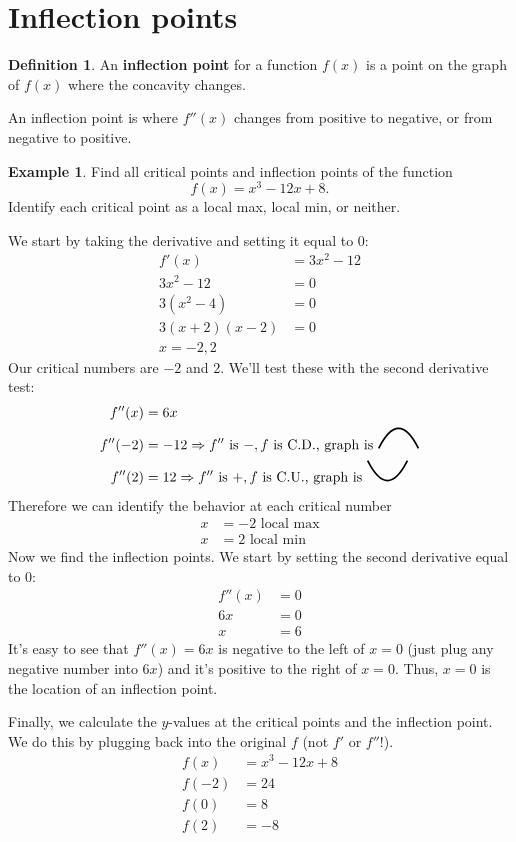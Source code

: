 \documentclass[oneside]{book}
\newcommand{\GenericConcaveDown}{\begin{tikzpicture}[very thick]
\draw (0,0) parabola bend (0.5,0.5) (1,0);
\end{tikzpicture}}
\newcommand{\GenericConcaveUp}{\begin{tikzpicture}[very thick,yscale=-1]
\draw (0,0) parabola bend (0.5,0.5) (1,0);
\end{tikzpicture}}
\newcommand{\define}[1]{\textbf{#1}}
\theoremstyle{definition}
\newtheorem{example}{Example}
\newtheorem{definition}{Definition}[section]
\theoremstyle{solution}
\newtheorem*{solution}{Solution}
\newenvironment{solution}{\vspace{2in}\comment}{\endcomment}
\begin{document}
\section{Inflection points}

\begin{definition}
An \define{inflection point} for a function $f(x)$ is a point on the
graph of $f(x)$ where the concavity changes.  \bigskip

An inflection point is where $f''(x)$ changes from positive to
negative, or from negative to positive.
\end{definition}

\begin{example}
Find all critical points and inflection points of the function
$$ 
f(x) = x^3 - 12x + 8.
$$
Identify each critical point as a local max, local min, or neither.  
\end{example}

\begin{solution}
We start by taking the derivative and setting it equal to $0$:
\begin{align*}
f' (x) & = 3x^2-12\\
3x^2-12 & = 0\\
3(x^2-4) & = 0\\
3(x+2)(x-2) & = 0\\
x= -2, 2
\end{align*}
Our critical numbers are $-2$ and $2$.  We'll test these with the
second derivative test:
\begin{align*}
f''(x) & = 6x\\
f''(-2) & = -12 \Rightarrow f'' \text{ is }-, f\text{ is C.D., graph is \GenericConcaveDown}\\
f''(2) & = 12 \Rightarrow f'' \text{ is }+, f\text{ is C.U., graph is \GenericConcaveUp}
\end{align*}
Therefore we can identify the behavior at each critical number
\begin{align*}
x & = -2 \text{ local max}\\
x & = 2 \text{ local min}
\end{align*}
Now we find the inflection points. We start by setting the second
derivative equal to $0$:
\begin{align*}
f''(x) & = 0\\
6x & = 0\\
x & = 6
\end{align*}
It's easy to see that $f''(x) = 6x$ is negative to the left of $x=0$
(just plug any negative number into $6x$) and it's positive to the
right of $x=0$.  Thus, $x=0$ is the location of an inflection point.

Finally, we calculate the $y$-values at the critical points and the
inflection point.  We do this by plugging back into the original $f$
(not $f'$ or $f''$!).
\begin{align*}
f(x) & = x^3-12x+8\\
f(-2) & = 24\\
f(0) & = 8\\
f(2) & = -8
\end{align*}
\end{solution}
\end{document}
